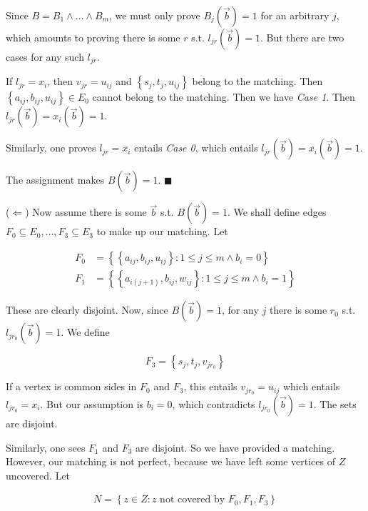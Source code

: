 \documentclass[a4paper]{article}
\begin{document}
Since $B = B_1 \land  \ldots \land B_m$, we must only prove $B_j(\overrightarrow{b}) = 1$
for an arbitrary $j$, which amounts to proving there is some $r$ s.t. 
$l_{jr}(\overrightarrow{b}) = 1$. But there are two cases for any such 
$l_{jr}$.

If $l_{jr} = x_i$, then $v_{jr} = u_{ij}$ and $\left\{ s_j, t_j, u_{ij} \right\} $
belong to the matching. Then $\left\{ a_{ij}, b_{ij}, u_{ij} \right\} \in E_0$
cannot belong to the matching. Then we have \textit{Case 1}.
Then $l_{jr}(\overrightarrow{b}) = x_i(\overrightarrow{b}) = 1$.

Similarly, one proves $l_{jr} = \overline{x_i}$ entails \textit{Case 0}, which
entails $l_{jr}(\overrightarrow{b}) = \overline{x_i}(\overrightarrow{b}) = 1$.

The assignment makes $B(\overrightarrow{b}) = 1$. $\blacksquare$

($\Leftarrow$) Now assume there is some $\overrightarrow{b}$ s.t.
$B(\overrightarrow{b}) = 1$. We shall define edges 
$F_0 \subseteq E_0, \ldots, F_3 \subseteq E_3$ to make up our matching.
Let 

\begin{align*}
    F_0 &= \left\{ \left\{ a_{ij}, b_{ij}, u_{ij} \right\} : 1 \leq j \leq m \land  b_i = 0  \right\} \\
    F_1 &= \left\{ \left\{ a_{i(j+1)}, b_{ij}, w_{ij} \right\} : 1 \leq j \leq m \land  b_i = 1  \right\}
\end{align*}

These are clearly disjoint. Now, since $B(\overrightarrow{b}) = 1$, for any $j$
there is some $r_0$ s.t. $l_{jr_0}(\overrightarrow{b}) = 1$. We define 

\begin{equation*}
    F_3 = \left\{ s_j, t_j, v_{jr_0} \right\} 
\end{equation*}

If a vertex is common sides in $F_0$ and $F_3$, this entails $v_{jr_0} =
u_{ij}$ which entails $l_{jr_0} = x_i$. But our assumption is $b_i = 0$, which
contradicts $l_{jr_0}(\overrightarrow{b}) = 1$. The sets are disjoint. 

Similarly, one sees $F_1$ and $F_3$ are disjoint. So we have 
provided a matching. However, our matching is not perfect,
because we have left some vertices of $Z$ uncovered. Let 

\begin{align*}
    N = \left\{ z \in Z : z \text{ not covered by } F_0, F_1, F_3 \right\} 
\end{align*}
\end{document}
